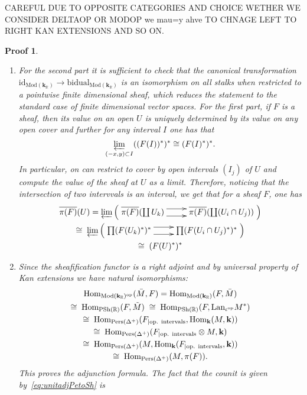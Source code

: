 \documentclass[a4paper, english, 11pt]{article}
\newcommand{\kk}[0]{\textbf{k}}
\newcommand{\Mod}[0]{\text{Mod}}
\newcommand{\Pe}{\text{Pers}}
\newcommand{\0}{\vec{0}}
\newcommand{\R}[0]{\mathbb{R}}
\newcommand{\op}[0]{\text{op}}
\newcommand{\Hom}[0]{\text{Hom}}
\newtheorem*{pf}{Proof} }
\begin{document}
CAREFUL DUE TO OPPOSITE CATEGORIES AND CHOICE WETHER WE CONSIDER DELTAOP OR MODOP we mau=y ahve TO CHNAGE LEFT TO RIGHT KAN EXTENSIONS AND SO ON. 
\begin{pf}
\begin{enumerate}
    \item For the second part it is sufficient to check that the canonical transformation $\text{id}_{\Mod(\kk_\R)} \to \text{bidual}_{\Mod(\kk_\R)}$ is an isomorphism on all stalks when restricted to a pointwise finite dimensional sheaf, which reduces the statement to the standard case of finite dimensional vector spaces.  For the first part, if $F$ is a sheaf, then its value on an open $U$ is uniquely determined by its value on any open cover and further for any interval $I$ one has that $$\varprojlim_{(-x,y)\subset I} ((F(I))^*)^* \cong (F(I)^*)^*.$$ In particular, on can restrict to cover by open intervals $(I_j)$ of $U$ and compute the value of the sheaf at $U$ as a limit.
   Therefore, noticing that the intersection of two intervvals is an interval, we get that for a sheaf $F$, one has 
   \begin{multline*}\overline{\pi(F)}(U) = \varprojlim \Big(\xymatrix{\overline{\pi(F)}(\coprod U_k) \ar@<1ex>[r] \ar@<-1ex>[r] & \overline{\pi(F)}(\coprod (U_i \cap U_j)) } \Big) \\ 
   \cong \; \varprojlim \Big(\xymatrix{\prod (F(U_k)^*)^* \ar@<1ex>[r] \ar@<-1ex>[r] & \prod(F(U_i \cap U_j)^*)^* } \Big) \\ \cong \; (F(U)^*)^*
   \end{multline*}
   \item Since the sheafification functor is a right adjoint and by universal property of Kan extensions  we have natural isomorphisms:
   \begin{multline*}
  \Hom_{\Mod(\kk_\R)^{\op}}(\Bar{M}, F)  = \Hom_{\Mod(\kk_\R)}(F,\Bar{M})    \\ \cong \;
  \Hom_{\text{PSh}(\R)}(F, \tilde{M}) \; \cong \; \Hom_{\text{PSh}(\R)}(F, \text{Lan}_{\iota^{\op}} M^*) \\ \cong \; \Hom_{\Pe(\Delta^+)}(F_{ | \text{op. intervals} }, \Hom_{\kk}(M, \kk)) \\ \cong \; \Hom_{\Pe(\Delta^+)}(F_{ | \text{op. intervals} }\otimes M, \kk) \\ \cong \; 
  \Hom_{\Pe(\Delta^+)}(M, \Hom_{\kk}(F_{ | \text{op. intervals} }, \kk)) \\ \cong \; 
 \Hom_{\Pe(\Delta^+)}(M, \pi(F)). 
   \end{multline*}
This proves the adjunction formula. The fact that the counit is given by~\eqref{eq:unitadjPetoSh} is 

\end{enumerate}
\end{pf}
\end{document}
